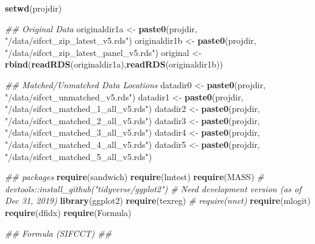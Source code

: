 \documentclass[
]{article}
\newenvironment{Shaded}{\begin{snugshade}}{\end{snugshade}}
\newcommand{\CommentTok}[1]{\textcolor[rgb]{0.56,0.35,0.01}{\textit{#1}}}
\newcommand{\KeywordTok}[1]{\textcolor[rgb]{0.13,0.29,0.53}{\textbf{#1}}}
\newcommand{\NormalTok}[1]{#1}
\newcommand{\StringTok}[1]{\textcolor[rgb]{0.31,0.60,0.02}{#1}}
\begin{document}
\begin{Shaded}
\begin{Highlighting}[]
\KeywordTok{setwd}\NormalTok{(projdir)}

\CommentTok{## Original Data}
\NormalTok{originaldir1a <-}\StringTok{ }\KeywordTok{paste0}\NormalTok{(projdir, }\StringTok{"/data/sifcct_zip_latest_v5.rds"}\NormalTok{)}
\NormalTok{originaldir1b <-}\StringTok{ }\KeywordTok{paste0}\NormalTok{(projdir, }\StringTok{"/data/sifcct_zip_latest_panel_v5.rds"}\NormalTok{)}
\NormalTok{original <-}\StringTok{ }\KeywordTok{rbind}\NormalTok{(}\KeywordTok{readRDS}\NormalTok{(originaldir1a),}\KeywordTok{readRDS}\NormalTok{(originaldir1b))}

\CommentTok{## Matched/Unmatched Data Locations}
\NormalTok{datadir0 <-}\StringTok{ }\KeywordTok{paste0}\NormalTok{(projdir, }\StringTok{"/data/sifcct_unmatched_v5.rds"}\NormalTok{)}
\NormalTok{datadir1 <-}\StringTok{ }\KeywordTok{paste0}\NormalTok{(projdir, }\StringTok{"/data/sifcct_matched_1_all_v5.rds"}\NormalTok{)}
\NormalTok{datadir2 <-}\StringTok{ }\KeywordTok{paste0}\NormalTok{(projdir, }\StringTok{"/data/sifcct_matched_2_all_v5.rds"}\NormalTok{)}
\NormalTok{datadir3 <-}\StringTok{ }\KeywordTok{paste0}\NormalTok{(projdir, }\StringTok{"/data/sifcct_matched_3_all_v5.rds"}\NormalTok{)}
\NormalTok{datadir4 <-}\StringTok{ }\KeywordTok{paste0}\NormalTok{(projdir, }\StringTok{"/data/sifcct_matched_4_all_v5.rds"}\NormalTok{)}
\NormalTok{datadir5 <-}\StringTok{ }\KeywordTok{paste0}\NormalTok{(projdir, }\StringTok{"/data/sifcct_matched_5_all_v5.rds"}\NormalTok{)}

\CommentTok{## packages}
\KeywordTok{require}\NormalTok{(sandwich)}
\KeywordTok{require}\NormalTok{(lmtest)}
\KeywordTok{require}\NormalTok{(MASS)}
\CommentTok{# devtools::install_github("tidyverse/ggplot2") # Need development version (as of Dec 31, 2019)}
\KeywordTok{library}\NormalTok{(ggplot2)}
\KeywordTok{require}\NormalTok{(texreg)}
\CommentTok{# require(nnet)}
\KeywordTok{require}\NormalTok{(mlogit)}
\KeywordTok{require}\NormalTok{(dfidx)}
\KeywordTok{require}\NormalTok{(Formula)}

\CommentTok{## Formula (SIFCCT) ##}


\end{Highlighting}
\end{Shaded}
\end{document}
